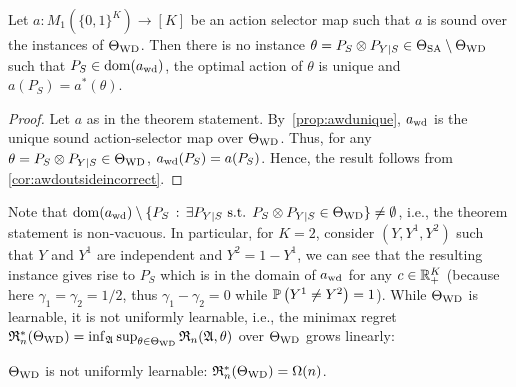 \begin{thm}
	\label{thm:MaxLearnability}
	Let $a: M_1(\{0,1\}^K) \to [K]$ be an action selector map
	such that $a$ is sound over the instances of $\Theta_{\mathrm{WD}}$.
	Then there is no instance $\theta = P_S\otimes P_{Y|S} \in \Theta_{\mathrm{SA}}\setminus \Theta_{\mathrm{WD}}$ such that 
	$P_S\in \mathrm{dom}(a_{\mathrm{wd}})$, the optimal action of $\theta$ is unique
	and $a(P_S) = a^*(\theta)$.
\end{thm}
\begin{proof}
	Let $a$ as in the theorem statement. By~\cref{prop:awdunique}, $a_{\mathrm{wd}}$ is the unique sound action-selector map over $\Theta_{\mathrm{WD}}$.
	Thus, for any $\theta = P_S\otimes P_{Y|S}\in \Theta_{\mathrm{WD}}$, $a_{\mathrm{wd}}(P_S) = a(P_S)$.
	Hence, the result follows from \cref{cor:awdoutsideincorrect}.
\end{proof}

Note that $\mathrm{dom}(a_{\mathrm{wd}})\setminus \{ P_S \,:\, \exists P_{Y|S} \textrm{ s.t. } P_S \otimes P_{Y|S} \in \Theta_{\mathrm{WD}} \} \ne \emptyset$, i.e., the theorem statement is non-vacuous.
In particular, for $K=2$, consider $(Y,Y^1,Y^2)$ such that $Y$ and $Y^1$ are independent and $Y^2 = 1-Y^1$, we can see that the resulting instance gives rise to $P_S$ which is in the domain of $a_{\mathrm{wd}}$ for any $c\in \mathbb{R}_+^K$ (because here $\gamma_1 = \gamma_2 = 1/2$, thus $\gamma_1 - \gamma_2 = 0$ while $\mathbb{P}\left(Y^1\ne Y^2\right)=1$).
While $\Theta_{\mathrm{WD}}$ is learnable, it is not uniformly learnable, i.e., the minimax regret $\mathfrak{R}_n^*(\Theta_{\mathrm{WD}}) = \inf_{\mathfrak{A}} \sup_{\theta\in \Theta_{\mathrm{WD}}} \mathfrak{R}_n(\mathfrak{A},\theta)$ over $\Theta_{\mathrm{WD}}$ grows linearly:

\begin{thm}
	\label{thm:nonunif}
	$\Theta_{\mathrm{WD}}$ is not uniformly learnable:
	$\mathfrak{R}_n^*(\Theta_{\mathrm{WD}}) = \Omega(n)$.
\end{thm}

